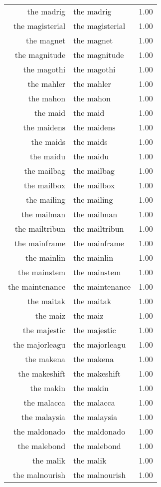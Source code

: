 \begin{table}[ht]
\begin{tabular}{rlr}
  the madrig & the madrig & 1.00 \\ 
  the magisterial & the magisterial & 1.00 \\ 
  the magnet & the magnet & 1.00 \\ 
  the magnitude & the magnitude & 1.00 \\ 
  the magothi & the magothi & 1.00 \\ 
  the mahler & the mahler & 1.00 \\ 
  the mahon & the mahon & 1.00 \\ 
  the maid & the maid & 1.00 \\ 
  the maidens & the maidens & 1.00 \\ 
  the maids & the maids & 1.00 \\ 
  the maidu & the maidu & 1.00 \\ 
  the mailbag & the mailbag & 1.00 \\ 
  the mailbox & the mailbox & 1.00 \\ 
  the mailing & the mailing & 1.00 \\ 
  the mailman & the mailman & 1.00 \\ 
  the mailtribun & the mailtribun & 1.00 \\ 
  the mainframe & the mainframe & 1.00 \\ 
  the mainlin & the mainlin & 1.00 \\ 
  the mainstem & the mainstem & 1.00 \\ 
  the maintenance & the maintenance & 1.00 \\ 
  the maitak & the maitak & 1.00 \\ 
  the maiz & the maiz & 1.00 \\ 
  the majestic & the majestic & 1.00 \\ 
  the majorleagu & the majorleagu & 1.00 \\ 
  the makena & the makena & 1.00 \\ 
  the makeshift & the makeshift & 1.00 \\ 
  the makin & the makin & 1.00 \\ 
  the malacca & the malacca & 1.00 \\ 
  the malaysia & the malaysia & 1.00 \\ 
  the maldonado & the maldonado & 1.00 \\ 
  the malebond & the malebond & 1.00 \\ 
  the malik & the malik & 1.00 \\ 
  the malnourish & the malnourish & 1.00 \\ 

\end{tabular}
\end{table}
